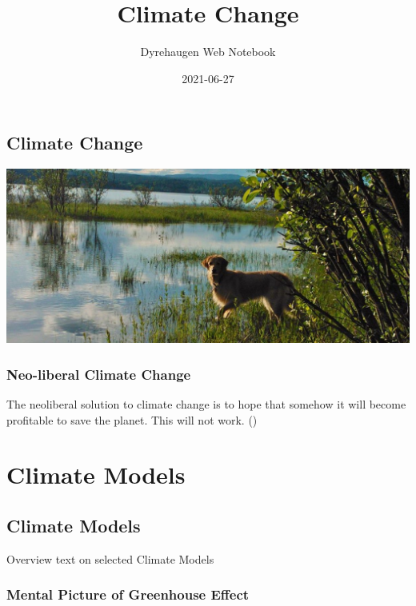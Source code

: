 \documentclass[
]{book}
\title{Climate Change}
\author{Dyrehaugen Web Notebook}
\date{2021-06-27}
\begin{document}
\maketitle

{
\setcounter{tocdepth}{1}
\tableofcontents
}
\hypertarget{climate-change}{%
\chapter{Climate Change}\label{climate-change}}

\includegraphics{fig/zelda.jpg}

\hypertarget{neo-liberal-climate-change}{%
\section{Neo-liberal Climate Change}\label{neo-liberal-climate-change}}

The neoliberal solution to climate change is to hope
that somehow it will become profitable to save the planet.
This will not work.
(\citet{ExistentialComics})

\hypertarget{part-climate-models}{%
\part{Climate Models}\label{part-climate-models}}

\hypertarget{climate-models}{%
\chapter{Climate Models}\label{climate-models}}

Overview text on selected Climate Models

\hypertarget{mental-picture-of-greenhouse-effect}{%
\section{Mental Picture of Greenhouse Effect}\label{mental-picture-of-greenhouse-effect}}
\end{document}
